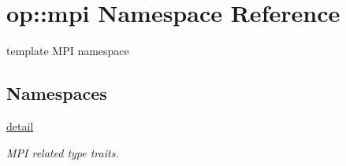\hypertarget{namespaceop_1_1mpi}{\section{op\-:\-:mpi Namespace Reference}
\label{namespaceop_1_1mpi}
}


template M\-P\-I namespace  


\subsection*{Namespaces}
\begin{DoxyCompactItemize}
\item 
\hyperlink{namespaceop_1_1mpi_1_1detail}{detail}
\begin{DoxyCompactList}\small\item\em M\-P\-I related type traits. \end{DoxyCompactList}\end{DoxyCompactItemize}
